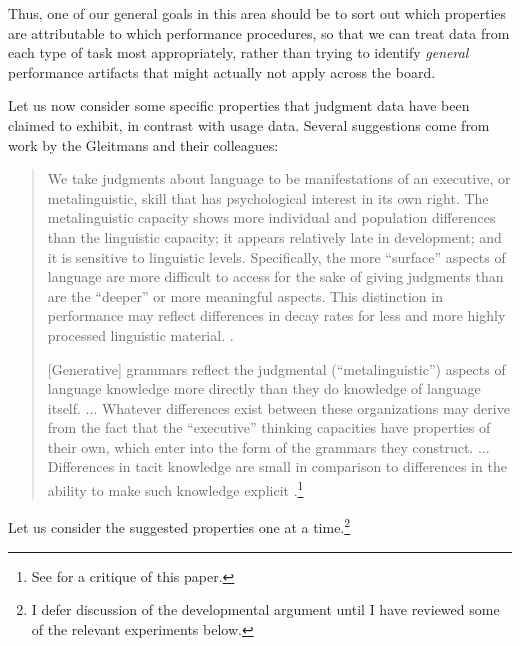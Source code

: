 \noindent
Thus, one of our general goals in this area should be to sort out which properties are attributable to which performance procedures, so that we can treat data from each type of task most appropriately, rather than trying to identify \textit{general} performance artifacts that might actually not apply across the board.

Let us now consider some specific properties that judgment data have been claimed to exhibit, in contrast with usage data. Several suggestions come from work by the Gleitmans and their colleagues:

\begin{quote}
We take judgments about language to be manifestations of an executive, or metalinguistic, skill that has psychological interest in its own right. The metalinguistic capacity shows more individual and population differences than the linguistic capacity; it appears relatively late in development; and it is sensitive to linguistic levels. Specifically, the more ``surface'' aspects of language are more difficult to access for the sake of giving judgments than are the ``deeper'' or more meaningful aspects. This distinction in performance may reflect  differences in decay rates for less and more highly processed linguistic material. \citep[99]{HirshPasekEtAl1978}.

[Generative] grammars reflect the judgmental (``metalinguistic'') as\-pects of language knowledge more directly than they do knowledge of language itself. ... Whatever differences exist between these organizations may derive from the fact that the ``executive'' thinking capacities have properties of their own, which enter into the form of the grammars they construct. ... Differences in tacit knowledge are small in comparison to differences in the ability to make such knowledge explicit  \citep[121]{GleitmanEtAl1979}.\footnote{See \citet{VanKleeck1982} for a critique of this paper.}

\end{quote}

\noindent
Let us consider the suggested properties one at a time.\footnote{I defer discussion of the developmental argument until I have reviewed some of the relevant experiments below.}


